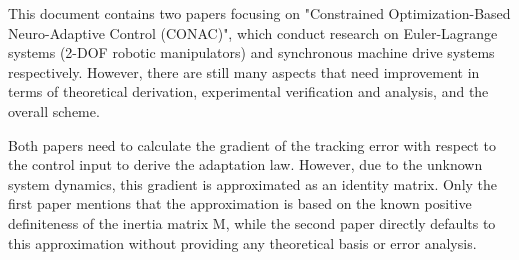\documentclass[12pt,english]{reviewresponse}
\begin{document}
\reviewer
\begin{generalcomment}
	This document contains two papers focusing on "Constrained Optimization-Based Neuro-Adaptive Control (CONAC)", which conduct research on Euler-Lagrange systems (2-DOF robotic manipulators) and synchronous machine drive systems respectively. However, there are still many aspects that need improvement in terms of theoretical derivation, experimental verification and analysis, and the overall scheme.
\end{generalcomment}

% 
\begin{revcomment}[3][1]{}
	Both papers need to calculate the gradient of the tracking error with respect to the control input to derive the adaptation law. 
  However, due to the unknown system dynamics, this gradient is approximated as an identity matrix. 
  Only the first paper mentions that the approximation is based on the known positive definiteness of the inertia matrix M, while the second paper directly defaults to this approximation without providing any theoretical basis or error analysis.
\end{revcomment}
\end{document}
